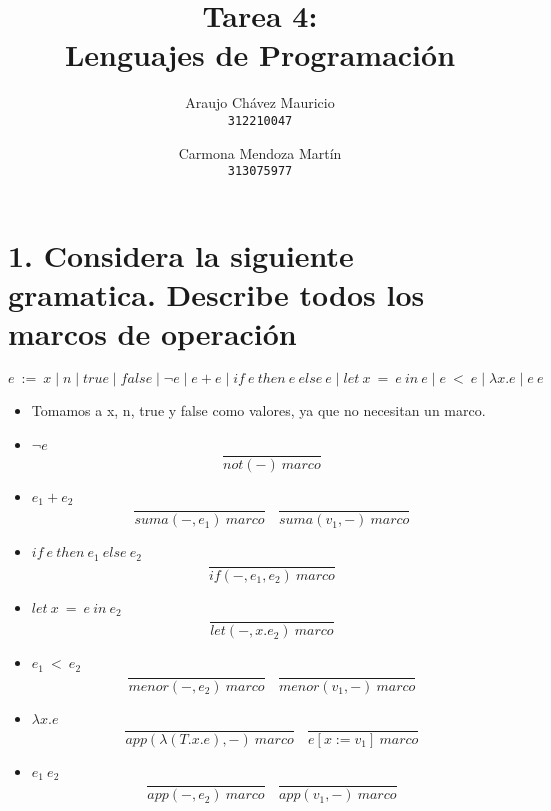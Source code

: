 \documentclass[11pt, a4paper]{report}
\begin{document}
\title{Tarea 4: \\Lenguajes de Programaci\'on}
\author{
  Araujo Chávez Mauricio\\
  \texttt{312210047}
  \and
  Carmona Mendoza Mart\'in\\
  \texttt{313075977}
}
\date{}
\maketitle

\section*{1. Considera la siguiente gramatica. Describe todos los marcos de operación}
$$ e\ :=\ x\mid n\mid true\mid false\mid \neg e\mid e+e\mid if\ e\ then\ e\ else\ e\mid let\ x\ =\ e\ in\ e\mid e\ <\ e\mid \lambda x.e\mid e\ e $$
	\begin{itemize}
		\item Tomamos a x, n, true y false como valores, ya que no necesitan un marco.
		\item $\neg e$
			$$ \frac{}{not(-)\ marco} $$
		\item $e_{1}+e_{2}$
			$$ \frac{}{suma(-,e_{1})\ marco}\ \ \ \ \frac{}{suma(v_{1},-)\ marco} $$
		\item $if\ e\ then\ e_{1}\ else\ e_{2}$
			$$ \frac{}{if(-,e_{1},e_{2})\ marco} $$
		\item $let\ x\ =\ e\ in\ e_{2}$
			$$ \frac{}{let(-,x.e_{2})\ marco} $$
		\item $ e_{1}\ <\ e_{2} $
			$$ \frac{}{menor(-,e_{2})\ marco}\ \ \ \ \frac{}{menor(v_{1},-)\ marco} $$
		\item $\lambda x.e$
			$$ \frac{}{app(\lambda(T.x.e),-)\ marco}\ \ \ \ \frac{}{e[x:=v_{1}]\ marco} $$
		\item $e_{1}\ e_{2}$
			$$ \frac{}{app(-,e_{2})\ marco}\ \ \ \ \frac{}{app(v_{1},-)\ marco} $$
	\end{itemize}
\end{document}
